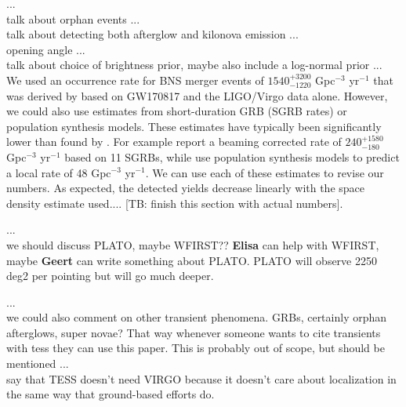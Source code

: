 \documentclass[modern]{aastex61}
\begin{document}
...\\
talk about orphan events
...\\
talk about detecting both afterglow and kilonova emission
...\\
opening angle
...\\
talk about choice of brightness prior, maybe also include a log-normal prior
...\\
We used an occurrence rate for BNS merger events of $1540^{+3200}_{-1220}$ Gpc$^{-3}$ yr$^{-1}$ that was derived by \citet{Abbott2017a} based on GW170817 and the LIGO/Virgo data alone. However, we could also use estimates from short-duration GRB (SGRB rates) or population synthesis models. These estimates have typically been significantly lower than found by \citet{Abbott2017a}. For example \citet{Fong2015} report a beaming corrected rate of $240^{+1580}_{-180}$ Gpc$^{-3}$ yr$^{-1}$ based on 11 SGRBs, while \citet{Chruslinska2017} use population synthesis models to predict a local rate of 48 Gpc$^{-3}$ yr$^{-1}$. We can use each of these estimates to revise our numbers. As expected, the detected yields decrease linearly with the space density estimate used.... [TB: finish this section with actual numbers].



...\\
we should discuss PLATO, maybe WFIRST?? \textbf{Elisa} can help with WFIRST, maybe \textbf{Geert} can write something about PLATO. PLATO will observe 2250 deg2 per pointing but will go much deeper.

...\\
we could also comment on other transient phenomena. GRBs, certainly orphan afterglows, super novae? That way whenever someone wants to cite transients with tess they can use this paper. This is probably out of scope, but should be mentioned
...\\
say that TESS doesn't need VIRGO because it doesn't care about localization in the same way that ground-based efforts do.
\end{document}
